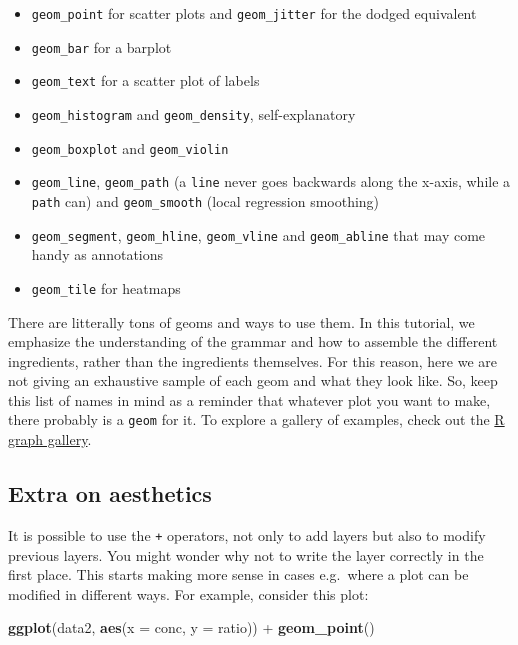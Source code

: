 \documentclass[]{book}
\newenvironment{Shaded}{}{}
\newcommand{\DataTypeTok}[1]{\textcolor[rgb]{0.56,0.13,0.00}{#1}}
\newcommand{\KeywordTok}[1]{\textcolor[rgb]{0.00,0.44,0.13}{\textbf{#1}}}
\newcommand{\NormalTok}[1]{#1}
\newcommand{\OperatorTok}[1]{\textcolor[rgb]{0.40,0.40,0.40}{#1}}
\newcommand{\StringTok}[1]{\textcolor[rgb]{0.25,0.44,0.63}{#1}}
\providecommand{\tightlist}{%
  \setlength{\itemsep}{0pt}\setlength{\parskip}{0pt}}
\begin{document}
\begin{itemize}
\tightlist
\item
  \texttt{geom\_point} for scatter plots and \texttt{geom\_jitter} for the dodged equivalent
\item
  \texttt{geom\_bar} for a barplot
\item
  \texttt{geom\_text} for a scatter plot of labels
\item
  \texttt{geom\_histogram} and \texttt{geom\_density}, self-explanatory
\item
  \texttt{geom\_boxplot} and \texttt{geom\_violin}
\item
  \texttt{geom\_line}, \texttt{geom\_path} (a \texttt{line} never goes backwards along the x-axis, while a \texttt{path} can) and \texttt{geom\_smooth} (local regression smoothing)
\item
  \texttt{geom\_segment}, \texttt{geom\_hline}, \texttt{geom\_vline} and \texttt{geom\_abline} that may come handy as annotations
\item
  \texttt{geom\_tile} for heatmaps
\end{itemize}

There are litterally tons of geoms and ways to use them. In this tutorial, we emphasize the understanding of the grammar and how to assemble the different ingredients, rather than the ingredients themselves. For this reason, here we are not giving an exhaustive sample of each geom and what they look like. So, keep this list of names in mind as a reminder that whatever plot you want to make, there probably is a \texttt{geom} for it. To explore a gallery of examples, check out the \href{https://www.r-graph-gallery.com/}{R graph gallery}.

\hypertarget{extra-on-aesthetics}{%
\subsection{Extra on aesthetics}\label{extra-on-aesthetics}}

It is possible to use the \texttt{+} operators, not only to add layers but also to modify previous layers. You might wonder why not to write the layer correctly in the first place. This starts making more sense in cases e.g.~where a plot can be modified in different ways. For example, consider this plot:

\begin{Shaded}
\begin{Highlighting}[]
\KeywordTok{ggplot}\NormalTok{(data2, }\KeywordTok{aes}\NormalTok{(}\DataTypeTok{x =}\NormalTok{ conc, }\DataTypeTok{y =}\NormalTok{ ratio)) }\OperatorTok{+}
\StringTok{  }\KeywordTok{geom_point}\NormalTok{()}
\end{Highlighting}
\end{Shaded}
\end{document}
